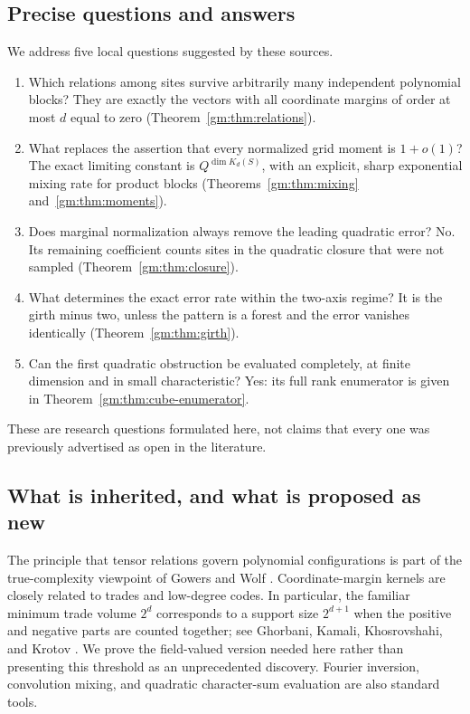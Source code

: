 \documentclass[11pt,a4paper]{article}
\numberwithin{equation}{section}
\theoremstyle{definition}
\theoremstyle{remark}
\newcommand{\1}{\mathbf 1}
\begin{document}
\subsection{Precise questions and answers}
We address five local questions suggested by these sources.
\begin{enumerate}[label=(\roman*)]
\item Which relations among sites survive arbitrarily many independent
polynomial blocks? They are exactly the vectors with all coordinate
margins of order at most $d$ equal to zero
(Theorem~\ref{gm:thm:relations}).
\item What replaces the assertion that every normalized grid moment is
$1+o(1)$? The exact limiting constant is
$Q^{\dim K_d(S)}$, with an explicit, sharp exponential mixing rate for
product blocks (Theorems~\ref{gm:thm:mixing} and~\ref{gm:thm:moments}).
\item Does marginal normalization always remove the leading quadratic
error? No. Its remaining coefficient counts sites in the quadratic closure
that were not sampled (Theorem~\ref{gm:thm:closure}).
\item What determines the exact error rate within the two-axis regime?
It is the girth minus two, unless the pattern is a forest and the error
vanishes identically (Theorem~\ref{gm:thm:girth}).
\item Can the first quadratic obstruction be evaluated completely, at
finite dimension and in small characteristic? Yes: its full rank
enumerator is given in Theorem~\ref{gm:thm:cube-enumerator}.
\end{enumerate}
These are research questions formulated here, not claims that every one
was previously advertised as open in the literature.

\subsection{What is inherited, and what is proposed as new}
The principle that tensor relations govern polynomial configurations is
part of the true-complexity viewpoint of Gowers and Wolf \cite{gw}.
Coordinate-margin kernels are closely related to trades and low-degree
codes. In particular, the familiar minimum trade volume $2^d$ corresponds
to a support size $2^{d+1}$ when the positive and negative parts are
counted together; see Ghorbani, Kamali, Khosrovshahi, and Krotov
\cite{trades}. We prove the field-valued version needed here rather than
presenting this threshold as an unprecedented discovery. Fourier inversion,
convolution mixing, and quadratic character-sum evaluation are also
standard tools.
\end{document}
